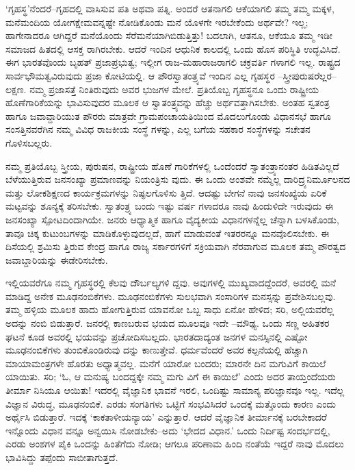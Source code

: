 ‘ಗೃಹಸ್ಥ’ನೆಂದರೆ–ಗೃಹದಲ್ಲಿ ವಾಸಿಸುವ ಪತಿ ಅಥವಾ ಪತ್ನಿ. ಅಂದರೆ ಆತನಾಗಲಿ ಆಕೆಯಾಗಲಿ ತಮ್ಮ ತಮ್ಮ ಮಕ್ಕಳ, ಮನೆಮಂದಿಯ ಯೋಗಕ್ಷೇಮವನ್ನಷ್ಟೇ ನೋಡಿಕೊಂಡು ಮನೆ ಯೊಳಗೇ ಇರಬೇಕೆಂದು ಅರ್ಥವೇ? ಇಲ್ಲ; ಹಾಗೇನಾದರೂ ಆಗಿದ್ದರೆ ಮನೆಯೊಂದು ಸೆರೆಮನೆಯಾಗಿಬಿಡುತ್ತಿತ್ತು! ಬದಲಾಗಿ, ಆತನೂ, ಆಕೆಯೂ ತಮ್ಮ ಇಡೀ ಸಮಾಜದ ಹಿತದಲ್ಲಿ ಆಸಕ್ತ ರಾಗಿರಬೇಕು. ಆದರೆ ಇಂದಿನ ಆಧುನಿಕ ಕಾಲದಲ್ಲಿ ಒಂದು ಹೊಸ ಪರಿಸ್ಥಿತಿ ಉದ್ಭವಿಸಿದೆ. ಈಗ ಭಾರತವೊಂದು ಬೃಹತ್ ಪ್ರಜಾಪ್ರಭುತ್ವ; ಇಲ್ಲೀಗ ರಾಜ-ಮಹಾರಾಜರಾಗಲಿ ಚಕ್ರವರ್ತಿ ಗಳಾಗಲಿ ಇಲ್ಲ. ರಾಷ್ಟ್ರದ ಸಾರ್ವಭೌಮತ್ವವಿರುವುದು ಪ್ರಜಾ ಕೋಟಿಯಲ್ಲಿ. ಆ ಪೌರಸ್ವಾತಂತ್ರ್ಯವೆ ಇಂದಿನ ಎಲ್ಲ ಗೃಹಸ್ಥರ –ಸ್ತ್ರೀಪುರುಷರೆಲ್ಲರ–ಲಕ್ಷಣ. ನಮ್ಮ ಪ್ರಜಾಸತ್ತೆ ನಿಂತಿರುವುದು ಅವರ ಭುಜಗಳ ಮೇಲೆ. ಪ್ರತಿಯೊಬ್ಬ ಗೃಹಸ್ಥನೂ ಒಂದು ರಾಷ್ಟ್ರೀಯ ಹೊಣೆಗಾರಿಕೆಯನ್ನು ಭಾವಿಸುವುದರ ಮೂಲಕ ಆ ಸ್ವಾತಂತ್ರ್ಯವನ್ನು ಹೆಚ್ಚು ಅರ್ಥವತ್ತಾಗಿಸಬೇಕು. ಅಂತಹ ಸ್ವತಂತ್ರ ಹಾಗೂ ಜವಾವ್ದಾರಿಯುತ ಪೌರರು ಮಾತ್ರವೇ ಗ್ರಾಮಪಂಚಾಯತಿಯಿಂದ ಮೊದಲುಗೊಂಡು ವಿಧಾನಸಭೆ ಹಾಗೂ ಸಂಸತ್ತಿನವರೆಗಿನ ನಮ್ಮ ವಿವಿಧ ರಾಜಕೀಯ ಸಂಸ್ಥೆ ಗಳನ್ನು, ಎಲ್ಲ ಬಗೆಯ ಸಹಕಾರ ಸಂಸ್ಥೆಗಳನ್ನು ಸಚೇತನ ಗೊಳಿಸಬಲ್ಲರು.

ನಮ್ಮ ಪ್ರತಿಯೊಬ್ಬ ಸ್ತ್ರೀಯ, ಪುರುಷನ, ರಾಷ್ಟ್ರೀಯ ಹೊಣೆ ಗಾರಿಕೆಗಳಲ್ಲಿ ಒಂದೆಂದರೆ ಸ್ವಾತಂತ್ರ್ಯಾನಂತರ ಹಿಡಿತವಿಲ್ಲದೆ ಬೆಳೆಯುತ್ತಿರುವ ಜನಸಂಖ್ಯಾ ಪ್ರಮಾಣವನ್ನು ನಿಯಂತ್ರಿಸು ವುದು. ಈ ಒಂದು ಅಂಶವೇ ನಮ್ಮೆಲ್ಲ ದಾರಿದ್ರ್ಯನಿರ್ಮೂಲನದ ಮತ್ತು ಲೋಕಶಿಕ್ಷಣದ ಕಾರ್ಯಕ್ರಮಗಳನ್ನು ನಿಷ್ಫಲಗೊಳಿಸು ತ್ತಿದೆ. ಆದಷ್ಟು ಬೇಗನೆ ನಾವು ಜನಸಂಖ್ಯೆಯ ಏರಿಕೆ ಮಟ್ಟವನ್ನು ಶೂನ್ಯಕ್ಕೆ ತರಿಸಬೇಕು. ಸ್ವಾತಂತ್ರ್ಯ ಬಂದು ಇಷ್ಟು ವರ್ಷ ಗಳಾದರೂ ನಾವು ಹಿಂದುಳಿದೇ ಇರುವುದು ಈ ಜನಸಂಖ್ಯಾ ಸ್ಪೋಟದಿಂದಾಗಿಯೇ. ಜನರು ಆಧ್ಯಾತ್ಮಿಕ ಹಾಗೂ ವೈದ್ಯಕೀಯ ವಿಧಾನಗಳನ್ನೆಲ್ಲ ಚೆನ್ನಾಗಿ ಬಳಸಿಕೊಂಡು, ತಾವೂ ಚಿಕ್ಕ ಕುಟುಂಬಗಳನ್ನು ಮಾಡಿಕೊಳ್ಳುವುದಲ್ಲದೆ, ಹಾಗೆ ಮಾಡುವಂತೆ ಇತರರನ್ನೂ ಮನವೊಲಿಸಬೇಕು. ಈ ದಿಸೆಯಲ್ಲಿ ಶ್ರಮಿಸು ತ್ತಿರುವ ಕೇಂದ್ರ ಹಾಗೂ ರಾಜ್ಯ ಸರ್ಕಾರಗಳಿಗೆ ಸಕ್ರಿಯವಾಗಿ ನೆರವಾಗುವ ಮೂಲಕ ತಮ್ಮ ಪೌರತ್ವದ ಜವಾಬ್ದಾರಿಯನ್ನು ಈಡೇರಿಸಬೇಕು.

ಇಲ್ಲಿಯವರೆಗೂ ನಮ್ಮ ಗೃಹಸ್ಥರಲ್ಲಿ ಕೆಲವು ದೌರ್ಬಲ್ಯಗಳಿ ದ್ದವು. ಅವುಗಳಲ್ಲಿ ಮುಖ್ಯವಾದದ್ದೆಂದರೆ, ಅವರಲ್ಲಿ ಮನೆ ಮಾಡಿದ್ದ ಅನೇಕ ಮೂಢನಂಬಿಕೆಗಳು. ಮೂಢನಂಬಿಕೆಗಳು ಸುಲಭವಾಗಿ ಸಂಸಾರಿಗಳ ಮನಸ್ಸನ್ನು ಪ್ರವೇಶಿಸಬಲ್ಲವು. ತಮ್ಮ ಹಳ್ಳಿಯ ಮೂಲಕ ಹಾದು ಹೋಗುತ್ತಿರುವ ಯಾವನೋ ಒಬ್ಬ ಸಾಧು ಏನೋ ಹೇಳಿದ; ಸರಿ, ಅಲ್ಲಿಯವರೆಲ್ಲ ಅದನ್ನು ನಂಬಿ ಬಿಡುತ್ತಾರೆ. ಜನರಲ್ಲಿ ಕಾಣಬರುವ ಭಯದ ಮೂಲವೂ ಇದೇ –ಮೌಢ್ಯ. ಒಂದು ಸಣ್ಣ ಅಹಿತಕರ ಘಟನೆ ಕೂಡ ಅವರಲ್ಲಿ ಭಯವನ್ನು ಪ್ರಚೋದಿಸಬಲ್ಲದು. ಭಾರತದಾದ್ಯಂತ ಜನಗಳ ಮನಸ್ಸಿನಲ್ಲಿ ಎಷ್ಟೋ ಮೂಢನಂಬಿಕೆಗಳು ತುಂಬಿಕೊಂಡಿರುವು ದನ್ನು ಕಾಣುತ್ತೇವೆ. ಧರ್ಮವೆಂದರೆ ಅವರ ಕಲ್ಪನೆಯಲ್ಲಿ ಹೆಚ್ಚಾಗಿ ಮಾಯಾಮಂತ್ರಗಳೇ ಹೊರತು ಅಧ್ಯಾತ್ಮವಲ್ಲ. ಮನೆಗೆ ಯಾರೋ ಬಂದರು; ಮಾರನೇ ದಿನ ಮಗುವಿಗೆ ಕಾಯಿಲೆ ಯಾಯಿತು. ಸರಿ; ‘ಓ, ಆ ಮನುಷ್ಯ ಬಂದದ್ದಕ್ಕೇ ನಮ್ಮ ಮಗು ವಿಗೆ ಈ ಕಾಯಿಲೆ’ ಎಂದು ಅದರ ತಾಯ್ತಂದೆಯರು ತೀರ್ಮಾ ನಿಸಿಯೂ ಆಯಿತು! ಇದರಲ್ಲಿ ವೈಜ್ಞಾನಿಕ ಭಾವನೆ ಇರಲಿ, ಒಂದಿಷ್ಟು ಸಾಮಾನ್ಯ ಪರಿಜ್ಞಾನವೂ ಇಲ್ಲ. ಇದೆಲ್ಲ ವಿಜ್ಞಾನ ವಿರುದ್ಧ, ಮೂಢನಂಬಿಕೆ. ಎರಡು ಸಂಗತಿಗಳು ಒಟ್ಟಿಗೆ ಸಂಭವಿಸಿದರೆ ಒಂದಕ್ಕೆ ಮತ್ತೊಂದು ಕಾರಣ ಎಂದು ಅರ್ಥೈಸಿ ಬಿಡುತ್ತಾರೆ. ಇದಕ್ಕೆ ‘ಕಾಕತಾಳೀಯನ್ಯಾಯ’ ಎನ್ನುತ್ತಾರೆ. ಆದರೆ ವೈಜ್ಞಾನಿಕ ತೀರ್ಮಾನಕ್ಕೆ ಬರಬೇಕಾದರೆ ಇನ್ನೊಂದು ವಿಧಾನ ವನ್ನೂ ಅನ್ವಯಿಸಿ ನೋಡಬೇಕು–ಅದು ‘ಭೇದದ ವಿಧಾನ.’ ಒಂದು ನಿರ್ದಿಷ್ಟ ಸಂದರ್ಭದಲ್ಲಿ, ಎರಡು ಅಂಶಗಳ ಪೈಕಿ ಒಂದನ್ನು ಹಿಂತೆಗೆದು ನೋಡಿ; ಆಗಲೂ ಪರಿಣಾಮ ಹಿಂದಿ ನಂತೆಯೆ ಇದ್ದರೆ ನಾವು ಮೊದಲು ಭಾವಿಸಿದ್ದು ತಪ್ಪೆಂದು ಸಾಬೀತಾಗುತ್ತದೆ.

